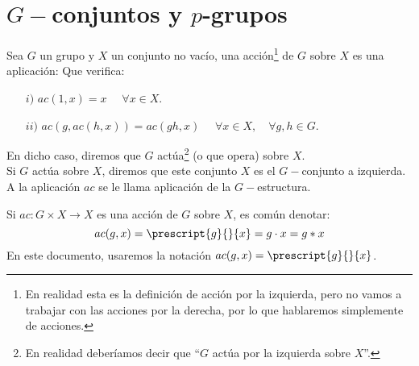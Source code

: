 \chapter{$G-$conjuntos y $p$-grupos}
\begin{definicion}
    Sea $G$ un grupo y $X$ un conjunto no vacío, una acción\footnote{En realidad esta es la definición de acción por la izquierda, pero no vamos a trabajar con las acciones por la derecha, por lo que hablaremos simplemente de acciones.} de $G$ sobre $X$ es una aplicación: 
    Que verifica:
    \begin{enumerate}
        \item[$i)$] $ac(1,x) = x$ $\quad \forall x\in X$.
        \item[$ii)$] $ac(g, ac(h, x)) = ac(gh, x)$ $\quad \forall x\in X, \quad \forall g,h\in G$.
    \end{enumerate}
    En dicho caso, diremos que $G$ actúa\footnote{En realidad deberíamos decir que ``$G$ actúa por la izquierda sobre $X$''.} (o que opera) sobre $X$.\\

    \noindent
    Si $G$ actúa sobre $X$, diremos que este conjunto $X$ es el $G-$conjunto a izquierda. A la aplicación $ac$ se le llama aplicación de la $G-$estructura.
\end{definicion}

\begin{notacion}
    Si $ac:G\times X\to X$ es una acción de $G$ sobre $X$, es común denotar:
    \begin{equation*}
        ac(g,x) = \prescript{g}{}{x} = g\cdot x = g\ast x
    \end{equation*}
    En este documento, usaremos la notación $ac(g,x) = \prescript{g}{}{x}$.
\end{notacion}

